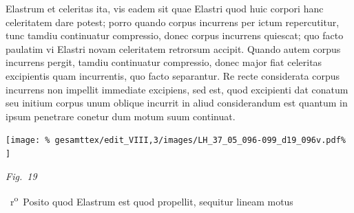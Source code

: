 %
%
Elastrum\protect{} et celeritas ita,  
%
%
vis eadem sit quae %
Elastri\protect{} quod huic corpori hanc celeritatem dare potest; 
%
 porro quando corpus incurrens per ictum repercutitur, tunc tamdiu continuatur compressio,%
\protect{} donec  
%
corpus incurrens quiescat; quo facto paulatim %
vi Elastri\protect{} 
%
%
novam celeritatem retrorsum accipit. Quando autem corpus incurrens pergit, tamdiu continuatur  
%
compressio\protect{}, donec major fiat celeritas excipientis quam incurrentis,  
%
quo facto separantur. Re recte considerata corpus incurrens non impellit immediate excipiens, sed 
%
%
 est, quod excipienti 
%
%
 dat conatum\protect{} seu initium 
%
%
 corpus unum oblique incurrit in aliud considerandum est quantum in ipsum penetrare conetur dum motum suum continuat.
 \pend
%
%
\vspace{2.0em} %
\centerline{%
\texttt{[image: \%
gesamttex/edit\_VIII,3/images/LH\_37\_05\_096-099\_d19\_096v.pdf\%
]}} 
\vspace{0.5em}
\centerline{%
\lbrack\textit{Fig.~19}\rbrack%
}
\vspace{1.5em}
%
\pstart 
{}%
~r\textsuperscript{o}\rbrack\ 
Posito quod Elastrum\protect{} est quod 
%
%
 propellit, sequitur lineam 
%
motus%
